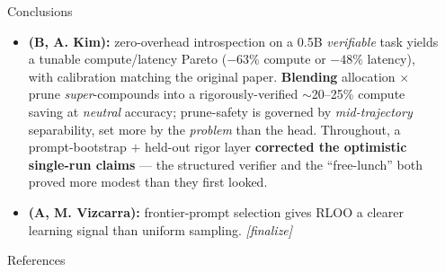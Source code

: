 \documentclass[final]{beamer}
\newlength{\sepwidth}
\newlength{\colwidth}
\newcommand{\separatorcolumn}{\begin{column}{\sepwidth}\end{column}}
\begin{document}
\begin{frame}[t]
\begin{columns}[t]
\begin{column}{\colwidth}
  \begin{block}{Conclusions}
    \begin{itemize}
      \item \textbf{(B, A. Kim):} zero-overhead introspection on a 0.5B \emph{verifiable} task
        yields a tunable compute/latency Pareto ($-63\%$ compute or $-48\%$ latency), with
        calibration matching the original paper. \textbf{Blending} allocation $\times$ prune
        \emph{super}-compounds into a rigorously-verified $\sim$20--25\% compute saving at
        \emph{neutral} accuracy; prune-safety is governed by \emph{mid-trajectory} separability,
        set more by the \emph{problem} than the head. Throughout, a prompt-bootstrap $+$
        held-out rigor layer \textbf{corrected the optimistic single-run claims} --- the
        structured verifier and the ``free-lunch'' both proved more modest than they first looked.
      \item \textbf{(A, M. Vizcarra):} frontier-prompt selection gives RLOO a clearer learning
        signal than uniform sampling. \emph{[finalize]}
    \end{itemize}
  \end{block}

  \begin{block}{References}
    \nocite{*}
    \footnotesize{}
  \end{block}

\end{column}

\separatorcolumn
\end{columns}
\end{frame}
\end{document}
